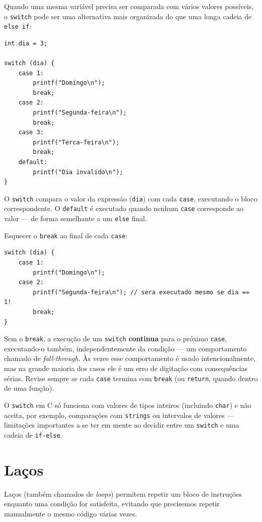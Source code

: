 \documentclass[12pt,a4paper,oneside]{extreport}
\begin{document}
Quando uma mesma variável precisa ser comparada com vários valores possíveis, o \texttt{switch} pode ser uma alternativa mais organizada do que uma longa cadeia de \texttt{else if}:

\begin{lstlisting}
int dia = 3;

switch (dia) {
    case 1:
        printf("Domingo\n");
        break;
    case 2:
        printf("Segunda-feira\n");
        break;
    case 3:
        printf("Terca-feira\n");
        break;
    default:
        printf("Dia invalido\n");
}
\end{lstlisting}

O \texttt{switch} compara o valor da expressão (\texttt{dia}) com cada \texttt{case}, executando o bloco correspondente. O \texttt{default} é executado quando nenhum \texttt{case} corresponde ao valor — de forma semelhante a um \texttt{else} final.

\begin{errocomum}
Esquecer o \texttt{break} ao final de cada \texttt{case}:
\begin{lstlisting}
switch (dia) {
    case 1:
        printf("Domingo\n");
    case 2:
        printf("Segunda-feira\n"); // sera executado mesmo se dia == 1!
        break;
}
\end{lstlisting}
Sem o \texttt{break}, a execução de um \texttt{switch} \textbf{continua} para o próximo \texttt{case}, executando-o também, independentemente da condição — um comportamento chamado de \textit{fall-through}. Às vezes esse comportamento é usado intencionalmente, mas na grande maioria dos casos ele é um erro de digitação com consequências sérias. Revise sempre se cada \texttt{case} termina com \texttt{break} (ou \texttt{return}, quando dentro de uma função).
\end{errocomum}

O \texttt{switch} em C só funciona com valores de tipos inteiros (incluindo \texttt{char}) e não aceita, por exemplo, comparações com \texttt{strings} ou intervalos de valores — limitações importantes a se ter em mente ao decidir entre um \texttt{switch} e uma cadeia de \texttt{if-else}.

\section{Laços}

Laços (também chamados de \textit{loops}) permitem repetir um bloco de instruções enquanto uma condição for satisfeita, evitando que precisemos repetir manualmente o mesmo código várias vezes.
\end{document}
